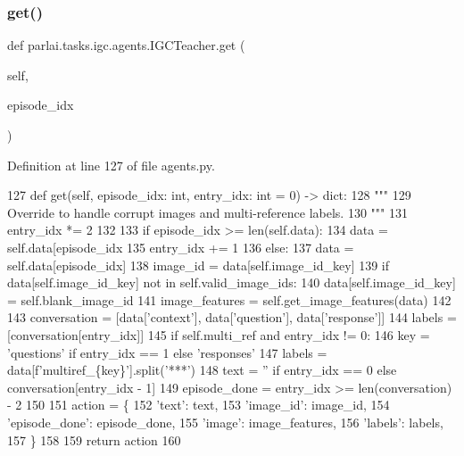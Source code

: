 \subsubsection{\texorpdfstring{get()}{get()}}
{\footnotesize\ttfamily def parlai.\+tasks.\+igc.\+agents.\+I\+G\+C\+Teacher.\+get (\begin{DoxyParamCaption}\item[{}]{self,  }\item[{}]{episode\+\_\+idx }\end{DoxyParamCaption})}



Definition at line 127 of file agents.\+py.


\begin{DoxyCode}
127     \textcolor{keyword}{def }get(self, episode\_idx: int, entry\_idx: int = 0) -> dict:
128         \textcolor{stringliteral}{"""}
129 \textcolor{stringliteral}{        Override to handle corrupt images and multi-reference labels.}
130 \textcolor{stringliteral}{        """}
131         entry\_idx *= 2
132 
133         \textcolor{keywordflow}{if} episode\_idx >= len(self.data):
134             data = self.data[episode\_idx %
135             entry\_idx += 1
136         \textcolor{keywordflow}{else}:
137             data = self.data[episode\_idx]
138         image\_id = data[self.image\_id\_key]
139         \textcolor{keywordflow}{if} data[self.image\_id\_key] \textcolor{keywordflow}{not} \textcolor{keywordflow}{in} self.valid\_image\_ids:
140             data[self.image\_id\_key] = self.blank\_image\_id
141         image\_features = self.get\_image\_features(data)
142 
143         conversation = [data[\textcolor{stringliteral}{'context'}], data[\textcolor{stringliteral}{'question'}], data[\textcolor{stringliteral}{'response'}]]
144         labels = [conversation[entry\_idx]]
145         \textcolor{keywordflow}{if} self.multi\_ref \textcolor{keywordflow}{and} entry\_idx != 0:
146             key = \textcolor{stringliteral}{'questions'} \textcolor{keywordflow}{if} entry\_idx == 1 \textcolor{keywordflow}{else} \textcolor{stringliteral}{'responses'}
147             labels = data[f\textcolor{stringliteral}{'multiref\_\{key\}'}].split(\textcolor{stringliteral}{'***'})
148         text = \textcolor{stringliteral}{''} \textcolor{keywordflow}{if} entry\_idx == 0 \textcolor{keywordflow}{else} conversation[entry\_idx - 1]
149         episode\_done = entry\_idx >= len(conversation) - 2
150 
151         action = \{
152             \textcolor{stringliteral}{'text'}: text,
153             \textcolor{stringliteral}{'image\_id'}: image\_id,
154             \textcolor{stringliteral}{'episode\_done'}: episode\_done,
155             \textcolor{stringliteral}{'image'}: image\_features,
156             \textcolor{stringliteral}{'labels'}: labels,
157         \}
158 
159         \textcolor{keywordflow}{return} action
160 
\end{DoxyCode}
